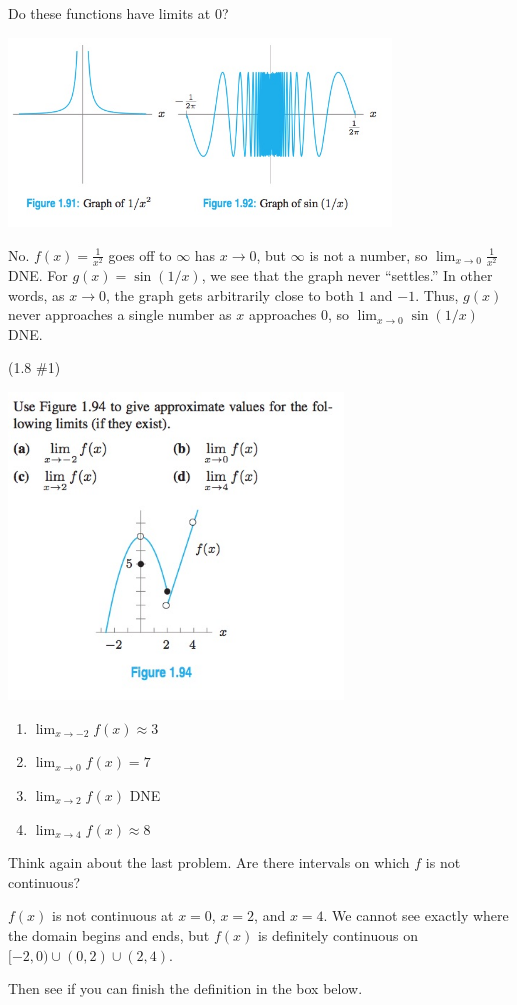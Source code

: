 \documentclass[11pt]{exam}
\begin{document}
\begin{questions}
\question Do these functions have limits at 0?

\includegraphics[width=4in]{Figures/nolimits.jpg}



\vspace*{-0.9cm}
\begin{solution}
  No. \(f(x) = \frac{1}{x^2}\) goes off to \(\infty\) has \(x \to 0\),
  but \(\infty\) is not a number, so \(\lim_{x\to 0} \frac{1}{x^2}\)
  DNE. For \(g(x) = \sin(1/x)\), we see that the graph never
  ``settles.'' In other words, as \(x \to 0\), the graph gets
  arbitrarily close to both \(1\) and \(-1\). Thus, \(g(x)\) never
  approaches a single number as \(x\) approaches \(0\), so \(\lim_{x
    \to 0} \sin(1/x)\) DNE.
\end{solution}
\question (1.8 \#1)

\includegraphics[width=3.5in]{Figures/no1.jpg}

\vspace*{-0.8cm}
\begin{solution}
  \begin{enumerate}
  \item \(\lim_{x\to-2} f(x) \approx 3\)
  \item \(\lim_{x\to 0} f(x) = 7\)
  \item \(\lim_{x \to 2} f(x)\) DNE
  \item \(\lim_{x\to 4} f(x) \approx 8\) 
  \end{enumerate}
\end{solution}
\question Think again about the last problem.  Are there intervals on
which $f$ is not continuous?
\begin{solution}
  \(f(x)\) is not continuous at \(x=0\), \(x=2\), and \(x=4\). We
  cannot see exactly where the domain begins and ends, but \(f(x)\) is
  definitely continuous on \([-2,0) \cup (0,2) \cup (2,4)\).
\end{solution}
Then see if you can finish the definition in the box below.


\end{questions}
\end{document}
